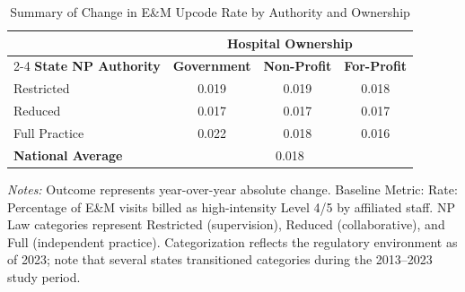 \begin{table}[htbp]
    \centering
    \caption{Summary of Change in E\&M Upcode Rate by Authority and Ownership}
    \label{tab:d_partb_em_upcode_rate}
    \vspace{0.2cm}
    \begin{tabular}{lccc}
        \toprule
        & \multicolumn{3}{c}{\textbf{Hospital Ownership}} \\
        \cmidrule(lr){2-4}
        \textbf{State NP Authority} & \textbf{Government} & \textbf{Non-Profit} & \textbf{For-Profit} \\
        \midrule
        Restricted & 0.019 & 0.019 & 0.018 \\
        Reduced & 0.017 & 0.017 & 0.017 \\
        Full Practice & 0.022 & 0.018 & 0.016 \\
        \midrule
        \textbf{National Average} & \multicolumn{3}{c}{0.018} \\
        \bottomrule
    \end{tabular}
    \vspace{0.1cm}
    \begin{minipage}{0.85\textwidth}
        \footnotesize \textit{Notes:} Outcome represents year-over-year absolute change. Baseline Metric: Rate: Percentage of E\&M visits billed as high-intensity Level 4/5 by affiliated staff. NP Law categories represent Restricted (supervision), Reduced (collaborative), and Full (independent practice). Categorization reflects the regulatory environment as of 2023; note that several states transitioned categories during the 2013--2023 study period.
    \end{minipage}
\end{table}
